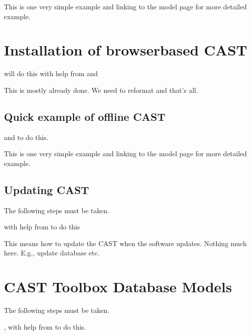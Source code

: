 \documentclass[letterpaper,10pt,english]{sphinxmanual}
\begin{document}
\sphinxAtStartPar
This is one very simple example and linking to the model page for more detailed example.


\chapter{Installation of browser\sphinxhyphen{}based CAST}
\label{\detokenize{contents/offline/offline_installation:installation-of-browser-based-cast}}\label{\detokenize{contents/offline/offline_installation::doc}}
\sphinxAtStartPar
{} will do this with help from  and 

\sphinxAtStartPar
This is mostly already done. We need to reformat and that’s all.


\section{Quick example of offline CAST}
\label{\detokenize{contents/offline/quick_example:quick-example-of-offline-cast}}\label{\detokenize{contents/offline/quick_example::doc}}
\sphinxAtStartPar
{} and  to do this.

\sphinxAtStartPar
This is one very simple example and linking to the model page for more detailed example.


\section{Updating CAST}
\label{\detokenize{contents/offline/updating:updating-cast}}\label{\detokenize{contents/offline/updating::doc}}
\sphinxAtStartPar
The following steps must be taken.

\sphinxAtStartPar
{} with help from  to do this

\sphinxAtStartPar
This means how to update the CAST when the software updates. Nothing much here. E.g., update database etc.


\chapter{CAST Toolbox \sphinxhyphen{} Database Models}
\label{\detokenize{contents/toolbox/database:cast-toolbox-database-models}}\label{\detokenize{contents/toolbox/database::doc}}
\sphinxAtStartPar
The following steps must be taken.

\sphinxAtStartPar
{},  with help from  to do this.
\end{document}
